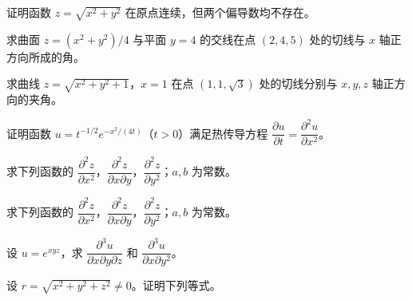 \noindent\begin{minipage}{\textwidth}
证明函数 $z=\sqrt{x^2+y^2}$ 在原点连续，但两个偏导数均不存在。
\end{minipage}\par\vfill
\noindent\begin{minipage}{\textwidth}
求曲面 $z=(x^2+y^2)/4$ 与平面 $y=4$ 的交线在点 $(2,4,5)$ 处的切线与 $x$ 轴正方向所成的角。
\end{minipage}\par\vfill
\noindent\begin{minipage}{\textwidth}
求曲线 $z=\sqrt{x^2+y^2+1}$，$x=1$ 在点 $(1,1,\sqrt3)$ 处的切线分别与 $x,y,z$ 轴正方向的夹角。
\end{minipage}\par\vfill
\newpage
\noindent\begin{minipage}{\textwidth}
证明函数 $u=t^{-1/2}e^{-x^2/(4t)}$（$t>0$）满足热传导方程 $\dfrac{\partial u}{\partial t}=\dfrac{\partial^2u}{\partial x^2}$。
\end{minipage}\par\vfill
\noindent\begin{minipage}{\textwidth}
求下列函数的 $\dfrac{\partial^2z}{\partial x^2}$，$\dfrac{\partial^2z}{\partial x\partial y}$，$\dfrac{\partial^2z}{\partial y^2}$；$a,b$ 为常数。
\end{minipage}\par\vfill
\noindent\begin{minipage}{\textwidth}
求下列函数的 $\dfrac{\partial^2z}{\partial x^2}$，$\dfrac{\partial^2z}{\partial x\partial y}$，$\dfrac{\partial^2z}{\partial y^2}$；$a,b$ 为常数。
\end{minipage}\par\vfill
\noindent\begin{minipage}{\textwidth}
设 $u=e^{xyz}$，求 $\dfrac{\partial^3u}{\partial x\partial y\partial z}$ 和 $\dfrac{\partial^3u}{\partial x\partial y^2}$。
\end{minipage}\par\vfill
\newpage
\noindent\begin{minipage}{\textwidth}
设 $r=\sqrt{x^2+y^2+z^2}\ne0$。证明下列等式。
\end{minipage}\par\vfill
